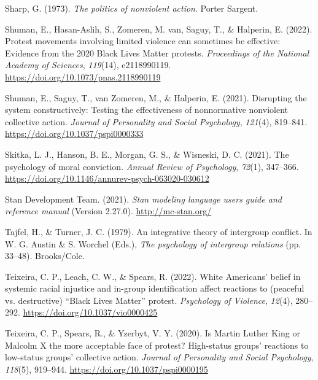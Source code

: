 \documentclass[12pt, letterpaper]{article}
\newenvironment{CSLReferences}[2]{}{}
\begin{document}
\begin{CSLReferences}{1}{0}
\leavevmode{}%
Sharp, G. (1973). \emph{The politics of nonviolent action}. Porter
Sargent.

\leavevmode{}%
Shuman, E., Hasan-Aslih, S., Zomeren, M. van, Saguy, T., \& Halperin, E.
(2022). Protest movements involving limited violence can sometimes be
effective: Evidence from the 2020 {Black Lives Matter} protests.
\emph{Proceedings of the National Academy of Sciences}, \emph{119}(14),
e2118990119. \url{https://doi.org/10.1073/pnas.2118990119}

\leavevmode{}%
Shuman, E., Saguy, T., van Zomeren, M., \& Halperin, E. (2021).
Disrupting the system constructively: {Testing} the effectiveness of
nonnormative nonviolent collective action. \emph{Journal of Personality
and Social Psychology}, \emph{121}(4), 819--841.
\url{https://doi.org/10.1037/pspi0000333}

\leavevmode{}%
Skitka, L. J., Hanson, B. E., Morgan, G. S., \& Wisneski, D. C. (2021).
The psychology of moral conviction. \emph{Annual Review of Psychology},
\emph{72}(1), 347--366.
\url{https://doi.org/10.1146/annurev-psych-063020-030612}

\leavevmode{}%
Stan Development Team. (2021). \emph{Stan modeling language users guide
and reference manual} (Version 2.27.0). \url{http://mc-stan.org/}

\leavevmode{}%
Tajfel, H., \& Turner, J. C. (1979). An integrative theory of intergroup
conflict. In W. G. Austin \& S. Worchel (Eds.), \emph{The psychology of
intergroup relations} (pp. 33--48). Brooks/Cole.

\leavevmode{}%
Teixeira, C. P., Leach, C. W., \& Spears, R. (2022). White {Americans}'
belief in systemic racial injustice and in-group identification affect
reactions to ({peaceful} vs. {destructive}) {``{Black Lives Matter}''}
protest. \emph{Psychology of Violence}, \emph{12}(4), 280--292.
\url{https://doi.org/10.1037/vio0000425}

\leavevmode{}%
Teixeira, C. P., Spears, R., \& Yzerbyt, V. Y. (2020). Is {Martin}
{Luther} {King} or {Malcolm} {X} the more acceptable face of protest?
{High}-status groups' reactions to low-status groups' collective action.
\emph{Journal of Personality and Social Psychology}, \emph{118}(5),
919--944. \url{https://doi.org/10.1037/pspi0000195}


\end{CSLReferences}
\end{document}
